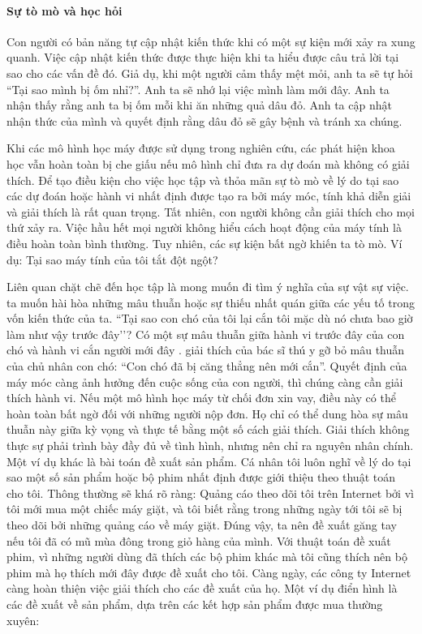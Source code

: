 \paragraph{Sự tò mò và học hỏi} Con người có bản năng tự cập nhật kiến thức khi có một sự kiện mới xảy ra xung quanh. Việc cập nhật kiến thức được thực hiện khi ta hiểu được câu trả lời tại sao cho các vấn đề đó. Giả dụ, khi một người cảm thấy mệt mỏi, anh ta sẽ tự hỏi ``Tại sao mình bị ốm nhỉ?''. Anh ta sẽ nhớ lại việc mình làm mới đây. Anh ta nhận thấy rằng anh ta bị ốm mỗi khi ăn những quả dâu đỏ. Anh ta cập nhật nhận thức của mình và quyết định rằng dâu đỏ sẽ gây bệnh và tránh xa chúng.

Khi các mô hình học máy được sử dụng trong nghiên cứu, các phát hiện khoa học vẫn hoàn toàn bị che giấu nếu mô hình chỉ đưa ra dự đoán mà không có giải thích. Để tạo điều kiện cho việc học tập và thỏa mãn sự tò mò về lý do tại sao các dự đoán hoặc hành vi nhất định được tạo ra bởi máy móc, tính khả diễn giải và giải thích là rất quan trọng. Tất nhiên, con người không cần giải thích cho mọi thứ xảy ra. Việc hầu hết mọi người không hiểu cách hoạt động của máy tính là điều hoàn toàn bình thường. Tuy nhiên, các sự kiện bất ngờ khiến ta tò mò. Ví dụ: Tại sao máy tính của tôi tắt đột ngột?

Liên quan chặt chẽ đến học tập là mong muốn đi tìm ý nghĩa của sự vật sự việc. ta muốn hài hòa những mâu thuẫn hoặc sự thiếu nhất quán giữa các yếu tố trong vốn kiến thức của ta. ``Tại sao con chó của tôi lại cắn tôi mặc dù nó chưa bao giờ làm như vậy trước đây’’? Có một sự mâu thuẫn giữa hành vi trước đây của con chó và hành vi cắn người mới đây . giải thích của bác sĩ thú y gỡ bỏ mâu thuẫn của chủ nhân con chó: ``Con chó đã bị căng thẳng nên mới cắn''. Quyết định của máy móc càng ảnh hưởng đến cuộc sống của con người, thì chúng càng cần giải thích hành vi. Nếu một mô hình học máy từ chối đơn xin vay, điều này có thể hoàn toàn bất ngờ đối với những người nộp đơn. Họ chỉ có thể dung hòa sự mâu thuẫn này giữa kỳ vọng và thực tế bằng một số cách giải thích. Giải thích không thực sự phải trình bày đầy đủ về tình hình, nhưng nên chỉ ra nguyên nhân chính. Một ví dụ khác là bài toán đề xuất sản phẩm. Cá nhân tôi luôn nghĩ về lý do tại sao một số sản phẩm hoặc bộ phim nhất định được giới thiệu theo thuật toán cho tôi. Thông thường sẽ khá rõ ràng: Quảng cáo theo dõi tôi trên Internet bởi vì tôi mới mua một chiếc máy giặt, và tôi biết rằng trong những ngày tới tôi sẽ bị theo dõi bởi những quảng cáo về máy giặt. Đúng vậy, ta nên đề xuất găng tay nếu tôi đã có mũ mùa đông trong giỏ hàng của mình. Với thuật toán đề xuất phim, vì những người dùng đã thích các bộ phim khác mà tôi cũng thích nên bộ phim mà họ thích mới đây được đề xuất cho tôi. Càng ngày, các công ty Internet càng hoàn thiện việc giải thích cho các đề xuất của họ. Một ví dụ điển hình là các đề xuất về sản phẩm, dựa trên các kết hợp sản phẩm được mua thường xuyên:

